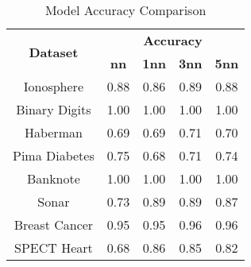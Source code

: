 \begin{table}[htbp]
\caption{Model Accuracy Comparison}
\begin{center}
\begin{tabular}{|c|c|c|c|c|}
\hline
\multirow{2}{*}{\textbf{Dataset}} & \multicolumn{4}{c|}{\textbf{Accuracy}} \\ \cline{2-5}
 & \textbf{nn} & \textbf{1nn} & \textbf{3nn} & \textbf{5nn} \\ \hline
Ionosphere & 0.88 & 0.86 & 0.89 & 0.88 \\ \hline
Binary Digits & 1.00 & 1.00 & 1.00 & 1.00 \\ \hline
Haberman & 0.69 & 0.69 & 0.71 & 0.70 \\ \hline
Pima Diabetes & 0.75 & 0.68 & 0.71 & 0.74 \\ \hline
Banknote & 1.00 & 1.00 & 1.00 & 1.00 \\ \hline
Sonar & 0.73 & 0.89 & 0.89 & 0.87 \\ \hline
Breast Cancer & 0.95 & 0.95 & 0.96 & 0.96 \\ \hline
SPECT Heart & 0.68 & 0.86 & 0.85 & 0.82 \\ \hline
\end{tabular}
\label{tab:accuracy}
\end{center}
\end{table}